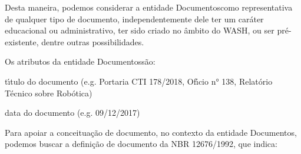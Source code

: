 \documentclass[
12pt,		%
openright,	%
twoside,  %
a4paper,			%
chapter=TITLE,		%
english,			%
french,				%
spanish,			%
brazil				%
]{USPSC-classe/USPSC}
\begin{document}
\noindent\begin{center}\mbox{\centering{}}\end{center}


Desta maneira, podemos considerar a entidade \textquotedbl Documentos\textquotedbl  como representativa de qualquer tipo de documento, independentemente dele ter um car\'ater educacional ou administrativo, ter sido criado no \^ambito do WASH, ou ser pr\'e-existente, dentre outras possibilidades.










Os atributos da entidade \textquotedbl Documentos\textquotedbl  s\~ao:











\begin{alineas}
\item t\'{\i}tulo do documento (e.g. \textquotedbl Portaria CTI 178/2018\textquotedbl , \textquotedbl Of\'{\i}cio n° 138\textquotedbl , \textquotedbl Relat\'orio T\'ecnico sobre Rob\'otica\textquotedbl )
\item data do documento (e.g. 09/12/2017)
\end{alineas}

Para apoiar a conceitua\c{c}\~ao de documento, no contexto da entidade \textquotedbl Documentos\textquotedbl , podemos buscar a defini\c{c}\~ao de documento da NBR 12676/1992, que indica:
\end{document}

